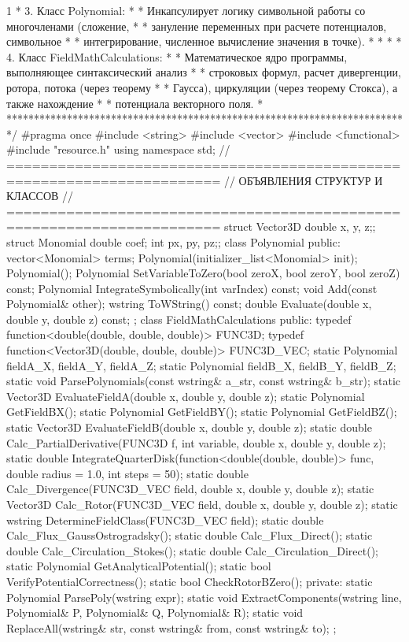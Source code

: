 \begin{listing}{1}
* 3. Класс Polynomial:                                                   *
* Инкапсулирует логику символьной работы со многочленами (сложение,      *
* зануление переменных при расчете потенциалов, символьное               *
* интегрирование, численное вычисление значения в точке).                *
*                                                                        *
* 4. Класс FieldMathCalculations:                                        *
* Математическое ядро программы, выполняющее синтаксический анализ       *
* строковых формул, расчет дивергенции, ротора, потока (через теорему    *
* Гаусса), циркуляции (через теорему Стокса), а также нахождение         *
* потенциала векторного поля.                                            *
*************************************************************************/
#pragma once
#include <string>
#include <vector>
#include <functional>
#include "resource.h"
using namespace std;
// =======================================================================
// ОБЪЯВЛЕНИЯ СТРУКТУР И КЛАССОВ
// =======================================================================
struct Vector3D {double x, y, z;}; struct Monomial {double coef; int px, py, pz;};
class Polynomial {
public:
    vector<Monomial> terms; Polynomial(initializer_list<Monomial> init);
    Polynomial(); Polynomial SetVariableToZero(bool zeroX, bool zeroY,
    bool zeroZ) const;
    Polynomial IntegrateSymbolically(int varIndex) const;
    void Add(const Polynomial& other); wstring ToWString() const;
    double Evaluate(double x, double y, double z) const;
};
class FieldMathCalculations {
public: typedef function<double(double, double, double)> FUNC3D;
    typedef function<Vector3D(double, double, double)> FUNC3D_VEC;
    static Polynomial fieldA_X, fieldA_Y, fieldA_Z;
    static Polynomial fieldB_X, fieldB_Y, fieldB_Z;
    static void ParsePolynomials(const wstring& a_str, const wstring& b_str);
    static Vector3D EvaluateFieldA(double x, double y, double z);
    static Polynomial GetFieldBX(); static Polynomial GetFieldBY();
    static Polynomial GetFieldBZ();
    static Vector3D EvaluateFieldB(double x, double y, double z);
    static double Calc_PartialDerivative(FUNC3D f, int variable, 
                                       double x, double y, double z);
    static double IntegrateQuarterDisk(function<double(double, double)> func, 
                                       double radius = 1.0, int steps = 50);
    static double Calc_Divergence(FUNC3D_VEC field, double x, double y, double z);
    static Vector3D Calc_Rotor(FUNC3D_VEC field, double x, double y, double z);
    static wstring DetermineFieldClass(FUNC3D_VEC field);
    static double Calc_Flux_GaussOstrogradsky();
    static double Calc_Flux_Direct(); static double Calc_Circulation_Stokes();
    static double Calc_Circulation_Direct(); static Polynomial GetAnalyticalPotential();
    static bool VerifyPotentialCorrectness(); static bool CheckRotorBZero();
private: static Polynomial ParsePoly(wstring expr);
    static void ExtractComponents(wstring line, Polynomial& P, 
                                  Polynomial& Q, Polynomial& R);
    static void ReplaceAll(wstring& str, const wstring& from, const wstring& to);
};
\end{listing}
\normalsize

